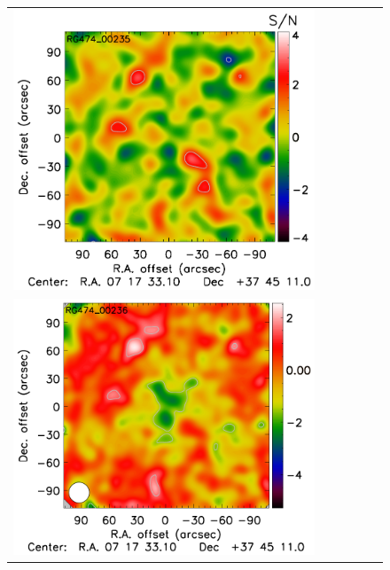 \documentclass[traditabstract]{aa}
\begin{document}
\begin{figure}[h]
{\begin{tabular}{llllll}
\includegraphics[trim=2.3cm 2.2cm 0cm 0cm, clip=true, scale=1]{Figure/TFcheckDoG_RG474_00235_Ymap_zobs0p4_15_15_45.pdf} \\
\includegraphics[trim=0cm 0.7cm 0cm 0cm, clip=true, scale=1]{Figure/Map_RG474_00236_Ymap_zobs0p4_processed_conv.pdf} & 

\end{tabular}}
\end{figure}
\end{document}
